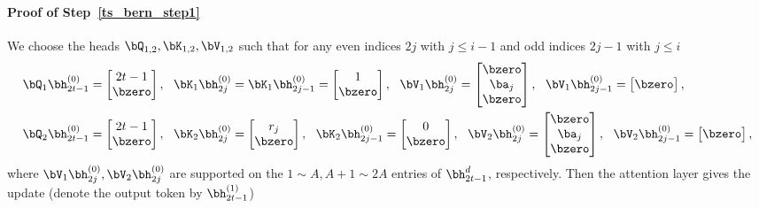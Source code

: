 \paragraph{Proof of Step~\ref{ts_bern_step1}} We choose the heads $\bQ_{1,2},\bK_{1,2},\bV_{1,2}$ such that for any even indices $2j$ with $j\leq i-1$ and odd indices $2j-1$ with $j\leq i$
\begin{align*}
&
     \bQ_{1}\bh^{(0)}_{2t-1}=\begin{bmatrix}
         2t-1\\ \bzero
    \end{bmatrix},~~ \bK_{1}\bh^{(0)}_{2j}=\bK_{1}\bh^{(0)}_{2j-1}=\begin{bmatrix}
        1\\ \bzero
    \end{bmatrix},~~
   \bV_{1}\bh^{(0)}_{2j}=\begin{bmatrix}
        \bzero\\\ba_j\\ \bzero
\end{bmatrix},~~\bV_{1}\bh^{(0)}_{2j-1}=\begin{bmatrix}
        \bzero
    \end{bmatrix},\\
   &
     \bQ_{2}\bh^{(0)}_{2t-1}=\begin{bmatrix}
         2t-1\\ \bzero
    \end{bmatrix},~~ \bK_{2}\bh^{(0)}_{2j}=\begin{bmatrix}
        r_j\\ \bzero
    \end{bmatrix},~~\bK_{2}\bh^{(0)}_{2j-1}=\begin{bmatrix}
        0\\ \bzero
    \end{bmatrix},~~
   \bV_{2}\bh^{(0)}_{2j}=\begin{bmatrix}
        \bzero\\\ba_j\\ \bzero
\end{bmatrix},~~\bV_{2}\bh^{(0)}_{2j-1}=\begin{bmatrix}
        \bzero
    \end{bmatrix},
\end{align*}
where $\bV_{1}\bh^{(0)}_{2j},\bV_{2}\bh^{(0)}_{2j}$ are supported on the $1\sim A,A+1\sim 2A$ entries of $\bh^d_{2t-1}$, respectively. Then the attention layer gives the update (denote the output token by $\bh^{(1)}_{2t-1}$)

